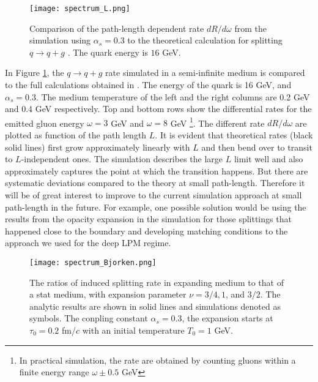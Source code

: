 \begin{figure}
\texttt{[image: spectrum\_L.png]}
\caption{Comparison of the path-length dependent rate $dR/d\omega$ from the simulation using $\alpha_s = 0.3$ to the theoretical calculation for splitting $q\rightarrow q+g$ \cite{CaronHuot:2010bp}. The quark energy is $16$ GeV.}
\label{fig:spectra-L-alphas=0.3}
\end{figure}

In Figure \ref{fig:spectra-L-alphas=0.3}, the $q\rightarrow q+g$ rate simulated in a semi-infinite medium is compared to the full calculations obtained in \cite{CaronHuot:2010bp}.
The energy of the quark is 16 GeV, and $\alpha_s = 0.3$.
The medium temperature of the left and the right columns are 0.2 GeV and 0.4 GeV respectively.
Top and bottom rows show the differential rates for the emitted gluon  energy $\omega = 3$ GeV and $\omega = 8$ GeV \footnote{In practical simulation, the rate are obtained by counting gluons within a finite energy range $\omega\pm 0.5$ GeV}.
The different rate $dR/d\omega$ are plotted as function of the path length $L$.
It is evident that theoretical rates (black solid lines) first grow approximately linearly with $L$ and then bend over to transit to $L$-independent ones.
The simulation describes the large $L$ limit well and also approximately captures the point at which the transition happens.
But there are systematic deviations compared to the theory at small path-length.
Therefore it will be of great interest to improve to the current simulation approach at small path-length in the future. 
For example, one possible solution would be using the results from the opacity expansion in the simulation for those splittings that happened close to the boundary and developing matching conditions to the approach we used for the deep LPM regime.

\begin{figure}
\texttt{[image: spectrum\_Bjorken.png]}
\caption{The ratios of induced splitting rate in expanding medium to that of a stat medium, with expansion parameter $\nu = 3/4, 1$, and $3/2$. The analytic results are shown in solid lines and simulations denoted as symbols. The conpling constant $\alpha_s=0.3$, the expansion starts at $\tau_0 = 0.2$ fm/$c$ with an initial temperature $T_0 = 1$ GeV.}
\label{fig:Bjorken-BDMPS}
\end{figure}

